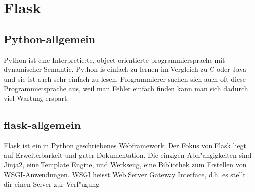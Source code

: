 \documentclass{article}
\begin{document}








\cleardoublepage



\section{Flask}


\subsection{Python-allgemein}

Python ist eine Interpretierte, object-orientierte programmiersprache mit dynamischer Semantic.
Python is einfach zu lernen im Vergleich zu C oder Java und sie ist auch sehr einfach zu lesen.
Programmierer suchen sich auch oft diese Programmiersprache aus, weil man Fehler einfach finden kann man sich dadurch viel Wartung erspart.
\subsection{flask-allgemein}

Flask ist ein in Python geschriebenes Webframework. Der Fokus von Flask liegt auf Erweiterbarkeit und guter Dokumentation.
Die einzigen Abh"angigkeiten sind Jinja2,
eine Template Engine, und Werkzeug, eine Bibliothek zum Erstellen von WSGI-Anwendungen.
WSGI heisst Web Server Gateway Interface, d.h. es stellt dir einen Server zur Verf"ugung
\end{document}

